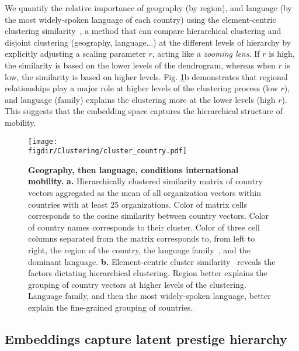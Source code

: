 \documentclass[12pt]{article} %
\def\figdir{../Figs}
\begin{document}
We quantify the relative importance of geography (by region), and language (by the most widely-spoken language of each country) using the element-centric clustering similarity~\autocite{gates2019element}, a method that can compare hierarchical clustering and disjoint clustering (geography, language...) at the different levels of hierarchy by explicitly adjusting a scaling parameter $r$, acting like a \textit{zooming lens}.
If $r$ is high, the similarity is based on the lower levels of the dendrogram, whereas when $r$ is low, the similarity is based on higher levels.
Fig. \ref{fig:clustering}b demonstrates that regional relationships play a major role at higher levels of the clustering process (low $r$), and language (family) explains the clustering more at the lower levels (high $r$).
This suggests that the embedding space captures the hierarchical structure of mobility.


%
%
\begin{figure}[p!]
	\centering
	\texttt{[image: \\figdir/Clustering/cluster\_country.pdf]}
	\caption{
		\textbf{Geography, then language, conditions international mobility.}
		\textbf{a.} Hierarchically clustered similarity matrix of country vectors aggregated as the mean of all organization vectors within countries with at least 25 organizations.
		Color of matrix cells corresponds to the cosine similarity between country vectors.
		Color of country names corresponds to their cluster.
		Color of three cell columns separated from the matrix corresponds to, from left to right, the region of the country, the language family~\autocite{ethnologue}, and the dominant language.
		\textbf{b.}	Element-centric cluster similarity~\autocite{gates2019element} reveals the factors dictating hierarchical clustering.
		Region better explains the grouping of country vectors at higher levels of the clustering.
		Language family, and then the most widely-spoken language, better explain the fine-grained grouping of countries.
	}
	\label{fig:clustering}
\end{figure}



%
%
\subsection*{Embeddings capture latent prestige hierarchy}
\end{document}
